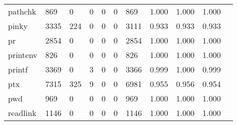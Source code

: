 \begin{longtable}{lp{1.10cm}p{1.10cm}p{1.10cm}p{1.10cm}p{1.10cm}p{1.10cm}p{1.10cm}p{1.10cm}p{1.10cm}p{1.10cm}}
pathchk   &                    869 &                                  0 &                                 0 &                                0 &                                 0 &                             869 &                             1.000 &                                 1.000 &                               1.000 \\
pinky     &                   3335 &                                224 &                                 0 &                                0 &                                 0 &                            3111 &                             0.933 &                                 0.933 &                               0.933 \\
pr        &                   2854 &                                  0 &                                 0 &                                0 &                                 0 &                            2854 &                             1.000 &                                 1.000 &                               1.000 \\
printenv  &                    826 &                                  0 &                                 0 &                                0 &                                 0 &                             826 &                             1.000 &                                 1.000 &                               1.000 \\
printf    &                   3369 &                                  0 &                                 3 &                                0 &                                 0 &                            3366 &                             0.999 &                                 1.000 &                               0.999 \\
ptx       &                   7315 &                                325 &                                 9 &                                0 &                                 0 &                            6981 &                             0.955 &                                 0.956 &                               0.954 \\
pwd       &                    969 &                                  0 &                                 0 &                                0 &                                 0 &                             969 &                             1.000 &                                 1.000 &                               1.000 \\
readlink  &                   1146 &                                  0 &                                 0 &                                0 &                                 0 &                            1146 &                             1.000 &                                 1.000 &                               1.000 \\

\end{longtable}
